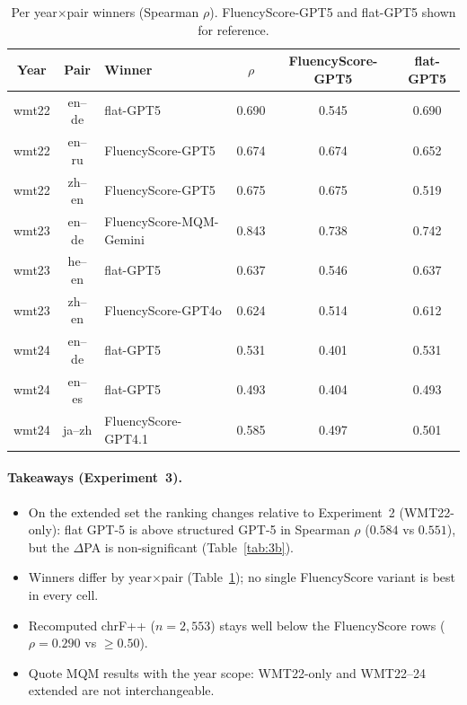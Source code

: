 \documentclass[11pt]{article}
\newcommand{\FS}{FluencyScore}
\begin{document}
\begin{table}[t]
\centering
\scriptsize
\setlength{\tabcolsep}{2pt}

\caption{Per year$\times$pair winners (Spearman $\rho$). \FS{}-GPT5 and flat-GPT5 shown for reference.}
\label{tab:3c}
\begin{tabularx}{\columnwidth}{cc>{\raggedright\arraybackslash}Xccc}
\toprule
Year & Pair & Winner & $\rho$ & \FS{}-GPT5 & flat-GPT5 \\
\midrule
wmt22 & en--de & flat-GPT5 & 0.690 & 0.545 & 0.690 \\
wmt22 & en--ru & \FS{}-GPT5 & 0.674 & 0.674 & 0.652 \\
wmt22 & zh--en & \FS{}-GPT5 & 0.675 & 0.675 & 0.519 \\
wmt23 & en--de & \FS{}-MQM-Gemini & 0.843 & 0.738 & 0.742 \\
wmt23 & he--en & flat-GPT5 & 0.637 & 0.546 & 0.637 \\
wmt23 & zh--en & \FS{}-GPT4o & 0.624 & 0.514 & 0.612 \\
wmt24 & en--de & flat-GPT5 & 0.531 & 0.401 & 0.531 \\
wmt24 & en--es & flat-GPT5 & 0.493 & 0.404 & 0.493 \\
wmt24 & ja--zh & \FS{}-GPT4.1 & 0.585 & 0.497 & 0.501 \\
\bottomrule
\end{tabularx}

\end{table}


\paragraph{Takeaways (Experiment~3).}
\begin{itemize}
\item On the extended set the ranking changes relative to Experiment~2
  (WMT22-only): flat GPT-5 is above structured GPT-5 in Spearman $\rho$
  ($0.584$ vs $0.551$), but the $\Delta$PA is non-significant
  (Table~\ref{tab:3b}).
\item Winners differ by year$\times$pair
  (Table~\ref{tab:3c}); no single \FS{} variant is best in every cell.
\item Recomputed chrF++ ($n{=}2{,}553$) stays well below the \FS{} rows
  ($\rho{=}0.290$ vs ${\ge}0.50$).
\item Quote MQM results with the year scope: WMT22-only and WMT22--24 extended
  are not interchangeable.
\end{itemize}
\end{document}
